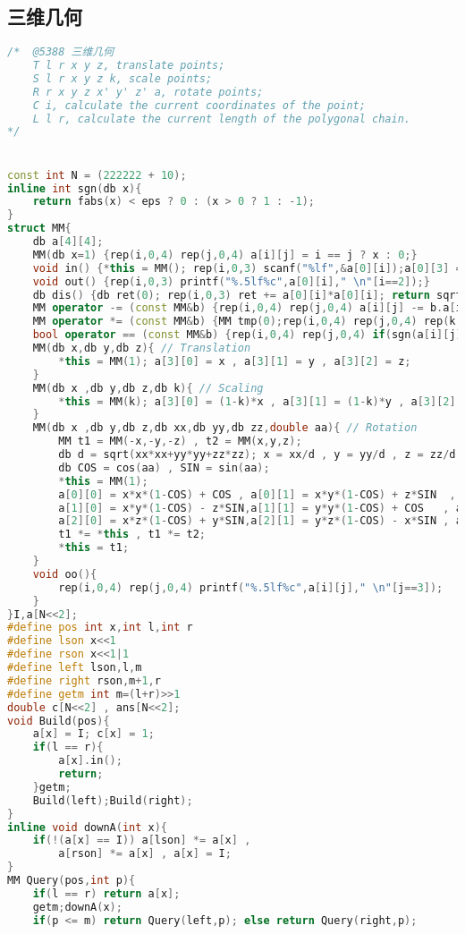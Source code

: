 \subsection{三维几何}
\begin{lstlisting}[language=C++]
/*	@5388 三维几何
	T l r x y z, translate points;
	S l r x y z k, scale points;
	R r x y z x' y' z' a, rotate points;
	C i, calculate the current coordinates of the point;
	L l r, calculate the current length of the polygonal chain.
*/


const int N = (222222 + 10);
inline int sgn(db x){
	return fabs(x) < eps ? 0 : (x > 0 ? 1 : -1);
}
struct MM{
	db a[4][4];
	MM(db x=1) {rep(i,0,4) rep(j,0,4) a[i][j] = i == j ? x : 0;}
	void in() {*this = MM(); rep(i,0,3) scanf("%lf",&a[0][i]);a[0][3] = 1;}
	void out() {rep(i,0,3) printf("%.5lf%c",a[0][i]," \n"[i==2]);}
	db dis() {db ret(0); rep(i,0,3) ret += a[0][i]*a[0][i]; return sqrt(ret);}
	MM operator -= (const MM&b) {rep(i,0,4) rep(j,0,4) a[i][j] -= b.a[i][j];return *this;}
	MM operator *= (const MM&b) {MM tmp(0);rep(i,0,4) rep(j,0,4) rep(k,0,4) tmp.a[i][j] += a[i][k] * b.a[k][j]; return *this = tmp;}
	bool operator == (const MM&b) {rep(i,0,4) rep(j,0,4) if(sgn(a[i][j] - b.a[i][j])) return false; return true;}
	MM(db x,db y,db z){ // Translation
		*this = MM(1); a[3][0] = x , a[3][1] = y , a[3][2] = z;
	}
	MM(db x ,db y,db z,db k){ // Scaling
		*this = MM(k); a[3][0] = (1-k)*x , a[3][1] = (1-k)*y , a[3][2] = (1-k)*z , a[3][3] = 1;
	}
	MM(db x ,db y,db z,db xx,db yy,db zz,double aa){ // Rotation
		MM t1 = MM(-x,-y,-z) , t2 = MM(x,y,z);
		db d = sqrt(xx*xx+yy*yy+zz*zz); x = xx/d , y = yy/d , z = zz/d;
		db COS = cos(aa) , SIN = sin(aa);
		*this = MM(1);
		a[0][0] = x*x*(1-COS) + COS , a[0][1] = x*y*(1-COS) + z*SIN	 , a[0][2] = x*z*(1-COS) - y*SIN;
		a[1][0] = x*y*(1-COS) - z*SIN,a[1][1] = y*y*(1-COS) + COS   , a[1][2] = y*z*(1-COS) + x*SIN;
		a[2][0] = x*z*(1-COS) + y*SIN,a[2][1] = y*z*(1-COS)	- x*SIN , a[2][2] = z*z*(1-COS) + COS;
		t1 *= *this , t1 *= t2;
		*this = t1;
	}
	void oo(){
		rep(i,0,4) rep(j,0,4) printf("%.5lf%c",a[i][j]," \n"[j==3]);
	}
}I,a[N<<2];
#define pos int x,int l,int r
#define lson x<<1
#define rson x<<1|1
#define left lson,l,m
#define right rson,m+1,r
#define getm int m=(l+r)>>1
double c[N<<2] , ans[N<<2];
void Build(pos){
	a[x] = I; c[x] = 1;
	if(l == r){
		a[x].in();
		return;
	}getm;
	Build(left);Build(right);
}
inline void downA(int x){
	if(!(a[x] == I)) a[lson] *= a[x] ,
		a[rson] *= a[x] , a[x] = I;
}
MM Query(pos,int p){
	if(l == r) return a[x];
	getm;downA(x);
	if(p <= m) return Query(left,p); else return Query(right,p);

\end{lstlisting}
